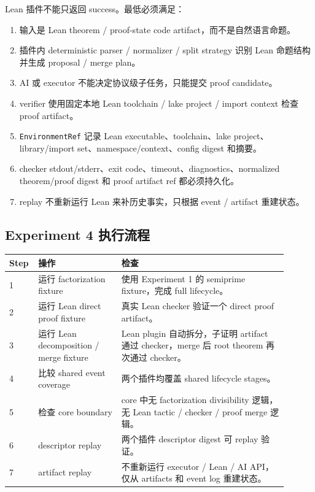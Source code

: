 \documentclass[11pt]{ctexart}
\begin{document}
Lean 插件不能只返回 success。最低必须满足：

\begin{enumerate}[leftmargin=2em]
  \item 输入是 Lean theorem / proof-state code artifact，而不是自然语言命题。
  \item 插件内 deterministic parser / normalizer / split strategy 识别 Lean 命题结构并生成 proposal / merge plan。
  \item AI 或 executor 不能决定协议级子任务，只能提交 proof candidate。
  \item verifier 使用固定本地 Lean toolchain / lake project / import context 检查 proof artifact。
  \item \texttt{EnvironmentRef} 记录 Lean executable、toolchain、lake project、library/import set、namespace/context、config digest 和摘要。
  \item checker stdout/stderr、exit code、timeout、diagnostics、normalized theorem/proof digest 和 proof artifact ref 都必须持久化。
  \item replay 不重新运行 Lean 来补历史事实，只根据 event / artifact 重建状态。
\end{enumerate}

\subsection{Experiment 4 执行流程}

\begin{longtable}{p{0.06\linewidth}p{0.28\linewidth}p{0.56\linewidth}}
\toprule
Step & 操作 & 检查 \\
\midrule
1 & 运行 factorization fixture & 使用 Experiment 1 的 semiprime fixture，完成 full lifecycle。 \\
2 & 运行 Lean direct proof fixture & 真实 Lean checker 验证一个 direct proof artifact。 \\
3 & 运行 Lean decomposition / merge fixture & Lean plugin 自动拆分，子证明 artifact 通过 checker，merge 后 root theorem 再次通过 checker。 \\
4 & 比较 shared event coverage & 两个插件均覆盖 shared lifecycle stages。 \\
5 & 检查 core boundary & core 中无 factorization divisibility 逻辑，无 Lean tactic / checker / proof merge 逻辑。 \\
6 & descriptor replay & 两个插件 descriptor digest 可 replay 验证。 \\
7 & artifact replay & 不重新运行 executor / Lean / AI API，仅从 artifacts 和 event log 重建状态。 \\
\bottomrule
\end{longtable}
\end{document}
